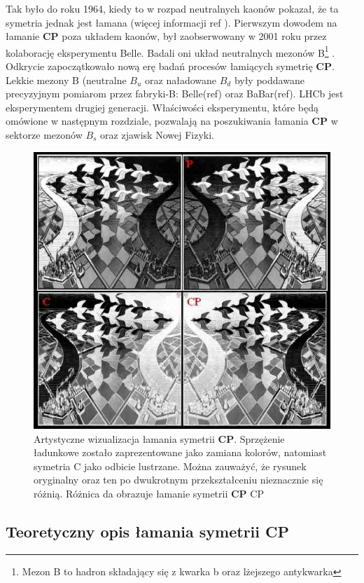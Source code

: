  Tak było do roku 1964, kiedy to w rozpad neutralnych kaonów pokazał, że ta symetria jednak jest łamana (więcej informacji ref ). Pierwszym dowodem na łamanie  \textbf{CP} poza układem kaonów, był zaobserwowany w 2001 roku przez kolaborację eksperymentu Belle. Badali oni układ neutralnych mezonów B\footnote{Mezon B to hadron składający się z kwarka b oraz lżejszego antykwarka } . Odkrycie zapoczątkowało nową erę badań procesów łamiących symetrię  \textbf{CP}. Lekkie mezony B (neutralne $B_u$ oraz naładowane $B_d$ były poddawane precyzyjnym pomiarom przez fabryki-B: Belle(ref) oraz BaBar(ref). LHCb jest eksperymentem drugiej generacji. Właściwości eksperymentu, które będą omówione w następnym rozdziale, pozwalają na poszukiwania łamania \textbf{CP}  w sektorze mezonów $B_{s}$ oraz zjawisk Nowej Fizyki.
 \begin{figure}[ht]
 \centering
 \includegraphics[scale=0.7]{rozdzial1/CPV.jpg}
 \caption{Artystyczne wizualizacja łamania symetrii \textbf{CP}. Sprzężenie ładunkowe zostało zaprezentowane jako zamiana kolorów, natomiast symetria C jako odbicie lustrzane. Można zauważyć, że rysunek oryginalny oraz ten po dwukrotnym przekształceniu nieznacznie się różnią. Różnica da obrazuje łamanie symetrii \textbf{CP} CP}
 \label{fig:CP}
\end{figure} 
\subsection{Teoretyczny opis łamania symetrii \textbf{CP} }

